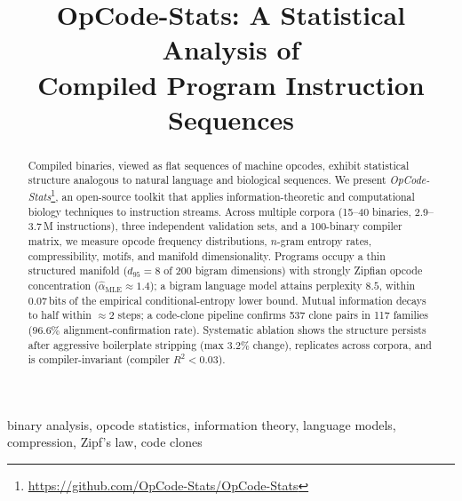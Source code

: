 \documentclass[conference]{IEEEtran}
\begin{document}
\title{OpCode-Stats: A Statistical Analysis of\\Compiled Program Instruction Sequences}

\author{%
  \and
}

\maketitle

\begin{abstract}
Compiled binaries, viewed as flat sequences of machine opcodes, exhibit
statistical structure analogous to natural language and biological sequences.
We present \emph{OpCode-Stats}\footnote{\url{https://github.com/OpCode-Stats/OpCode-Stats}},
an open-source toolkit that applies information-theoretic and computational
biology techniques to instruction streams.  Across multiple corpora
(15--40 binaries, 2.9--3.7\,M instructions), three independent validation
sets, and a 100-binary compiler matrix, we measure opcode frequency
distributions, $n$-gram entropy rates, compressibility, motifs, and
manifold dimensionality.  Programs occupy a thin structured manifold
($d_{95}{=}8$ of 200 bigram dimensions) with strongly Zipfian opcode
concentration ($\hat{\alpha}_{\mathrm{MLE}}{\approx}1.4$); a bigram language
model attains perplexity $8.5$, within $0.07$\,bits of the empirical
conditional-entropy lower bound.  Mutual information decays to half within
${\approx}2$ steps; a code-clone pipeline confirms 537 clone pairs in 117
families ($96.6\%$ alignment-confirmation rate).  Systematic ablation shows
the structure persists after aggressive boilerplate stripping
(max $3.2\%$ change), replicates across corpora, and is compiler-invariant
(compiler $R^2{<}0.03$).
\end{abstract}

\begin{IEEEkeywords}
binary analysis, opcode statistics, information theory, language models,
compression, Zipf's law, code clones
\end{IEEEkeywords}
\end{document}
